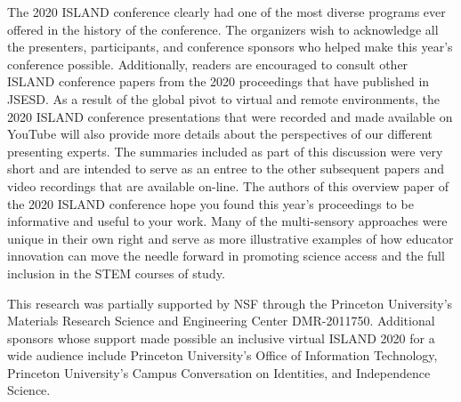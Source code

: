 \documentclass[11.5pt]{sig-alternate}
\begin{document}
\begin{large}
The 2020 ISLAND conference clearly had one of the most diverse programs ever offered in the history of the conference. The organizers wish to acknowledge all the presenters, participants, and conference sponsors who helped make this year’s conference possible. Additionally, readers are encouraged to consult other ISLAND conference papers from the 2020 proceedings that have published in JSESD. As a result of the global pivot to virtual and remote environments, the 2020 ISLAND conference presentations that were recorded and made available on YouTube will also provide more details about the perspectives of our different presenting experts. The summaries included as part of this discussion were very short and are intended to serve as an entree to the other subsequent papers and video recordings that are available on-line.
The authors of this overview paper of the 2020 ISLAND conference hope you found this year’s proceedings to be informative and useful to your work. Many of the multi-sensory approaches were unique in their own right and serve as more illustrative examples of how educator innovation can move the needle forward in promoting science access and the full inclusion in the STEM courses of study.
 
This research was partially supported by NSF through the Princeton University’s Materials Research Science and Engineering Center DMR-2011750. Additional sponsors whose support made possible an inclusive virtual ISLAND 2020 for a wide audience include Princeton University’s Office of Information Technology, Princeton University’s Campus Conversation on Identities, and Independence Science.

\end{large}
\end{document}
